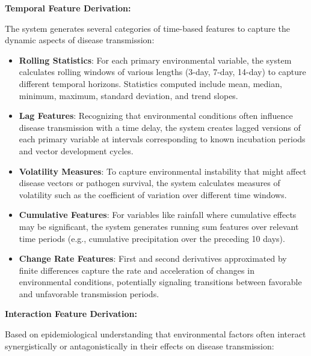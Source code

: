 \documentclass[12pt,a4paper]{report}
\begin{document}
\textbf{Temporal Feature Derivation:}

The system generates several categories of time-based features to capture the dynamic aspects of disease transmission:

\begin{itemize}
    \item \textbf{Rolling Statistics}: For each primary environmental variable, the system calculates rolling windows of various lengths (3-day, 7-day, 14-day) to capture different temporal horizons. Statistics computed include mean, median, minimum, maximum, standard deviation, and trend slopes.
    
    \item \textbf{Lag Features}: Recognizing that environmental conditions often influence disease transmission with a time delay, the system creates lagged versions of each primary variable at intervals corresponding to known incubation periods and vector development cycles.
    
    \item \textbf{Volatility Measures}: To capture environmental instability that might affect disease vectors or pathogen survival, the system calculates measures of volatility such as the coefficient of variation over different time windows.
    
    \item \textbf{Cumulative Features}: For variables like rainfall where cumulative effects may be significant, the system generates running sum features over relevant time periods (e.g., cumulative precipitation over the preceding 10 days).
    
    \item \textbf{Change Rate Features}: First and second derivatives approximated by finite differences capture the rate and acceleration of changes in environmental conditions, potentially signaling transitions between favorable and unfavorable transmission periods.
\end{itemize}

\textbf{Interaction Feature Derivation:}

Based on epidemiological understanding that environmental factors often interact synergistically or antagonistically in their effects on disease transmission:
\end{document}
